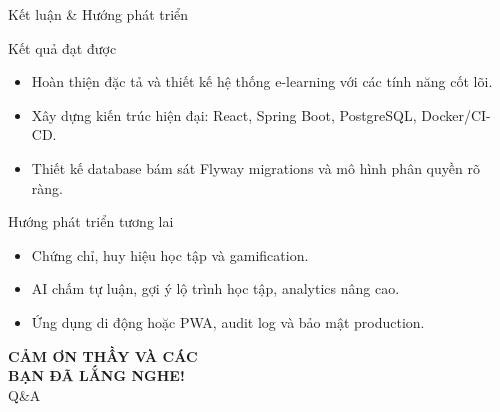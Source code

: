 \documentclass[10pt]{beamer}
\begin{document}
\begin{frame}{Kết luận \& Hướng phát triển}
    \begin{block}{Kết quả đạt được}
        \begin{itemize}
            \item Hoàn thiện đặc tả và thiết kế hệ thống e-learning với các tính năng cốt lõi.
            \item Xây dựng kiến trúc hiện đại: React, Spring Boot, PostgreSQL, Docker/CI-CD.
            \item Thiết kế database bám sát Flyway migrations và mô hình phân quyền rõ ràng.
        \end{itemize}
    \end{block}
    \begin{block}{Hướng phát triển tương lai}
        \begin{itemize}
            \item Chứng chỉ, huy hiệu học tập và gamification.
            \item AI chấm tự luận, gợi ý lộ trình học tập, analytics nâng cao.
            \item Ứng dụng di động hoặc PWA, audit log và bảo mật production.
        \end{itemize}
    \end{block}
\end{frame}

\begin{frame}
    \begin{center}
        \Huge \textbf{CẢM ƠN THẦY VÀ CÁC \\BẠN ĐÃ LẮNG NGHE!} \\
        \vspace{1cm}
        \large Q\&A
    \end{center}
\end{frame}
\end{document}
